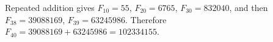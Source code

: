 Repeated addition gives $F_{10}=55$, $F_{20}=6765$, $F_{30}=832040$, and then $F_{38}=39088169$, $F_{39}=63245986$. Therefore $F_{40}=39088169+63245986=\boxed{102334155}$.
